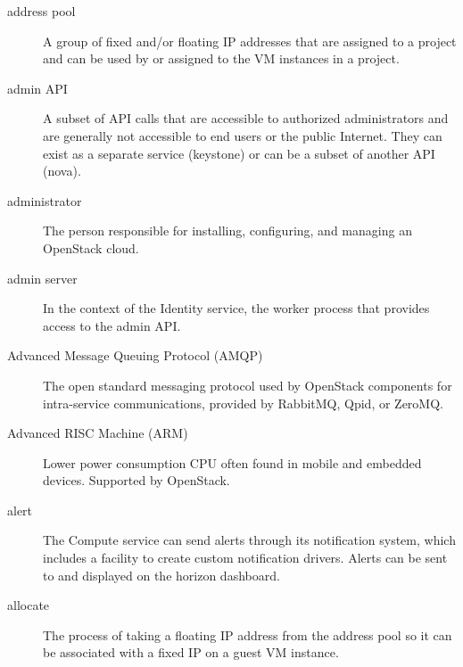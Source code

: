 \documentclass[letterpaper,10pt,english]{sphinxmanual}
\begin{document}
\begin{description}
\item[{address pool}] \leavevmode{}\label{_source/glossary:term-address-pool}
A group of fixed and/or floating IP addresses that are assigned
to a project and can be used by or assigned to the VM instances in a
project.

\item[{admin API}] \leavevmode{}\label{_source/glossary:term-admin-api}
A subset of API calls that are accessible to authorized
administrators and are generally not accessible to end users or the
public Internet. They can exist as a separate service (keystone) or
can be a subset of another API (nova).

\item[{administrator}] \leavevmode{}\label{_source/glossary:term-administrator}
The person responsible for installing, configuring,
and managing an OpenStack cloud.

\item[{admin server}] \leavevmode{}\label{_source/glossary:term-admin-server}
In the context of the Identity service, the worker process that
provides access to the admin API.

\item[{Advanced Message Queuing Protocol (AMQP)}] \leavevmode{}\label{_source/glossary:term-advanced-message-queuing-protocol-amqp}
The open standard messaging protocol used by OpenStack
components for intra-service communications, provided by RabbitMQ,
Qpid, or ZeroMQ.

\item[{Advanced RISC Machine (ARM)}] \leavevmode{}\label{_source/glossary:term-advanced-risc-machine-arm}
Lower power consumption CPU often found in mobile and embedded
devices. Supported by OpenStack.

\item[{alert}] \leavevmode{}\label{_source/glossary:term-alert}
The Compute service can send alerts through its notification
system, which includes a facility to create custom notification
drivers. Alerts can be sent to and displayed on the horizon
dashboard.

\item[{allocate}] \leavevmode{}\label{_source/glossary:term-allocate}
The process of taking a floating IP address from the address
pool so it can be associated with a fixed IP on a guest VM
instance.


\end{description}
\end{document}

